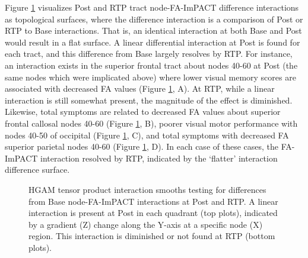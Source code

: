\documentclass[12pt]{article}
\begin{document}
Figure \ref{fig:lgio-intx-cc} visualizes Post and RTP tract node-FA-ImPACT difference interactions as topological surfaces, where the difference interaction is a comparison of Post or RTP to Base interactions. That is, an identical interaction at both Base and Post would result in a flat surface. A linear differential interaction at Post is found for each tract, and this difference from Base largely resolves by RTP. For instance, an interaction exists in the superior frontal tract about nodes 40-60 at Post (the same nodes which were implicated above) where lower visual memory scores are associated with decreased FA values (Figure \ref{fig:lgio-intx-cc}, A). At RTP, while a linear interaction is still somewhat present, the magnitude of the effect is diminished. Likewise, total symptoms are related to decreased FA values about superior frontal callosal nodes 40-60 (Figure \ref{fig:lgio-intx-cc}, B), poorer visual motor performance with nodes 40-50 of occipital (Figure \ref{fig:lgio-intx-cc}, C), and total symptoms with decreased FA superior parietal nodes 40-60 (Figure \ref{fig:lgio-intx-cc}, D). In each case of these cases, the FA-ImPACT interaction resolved by RTP, indicated by the `flatter' interaction difference surface.

\begin{figure}[H]
	\centering
	\caption{HGAM tensor product interaction smooths testing for differences from Base node-FA-ImPACT interactions at Post and RTP. A linear interaction is present at Post in each quadrant (top plots), indicated by a gradient (Z) change along the Y-axis at a specific node (X) region. This interaction is diminished or not found at RTP (bottom plots).}
	\label{fig:lgio-intx-cc}
\end{figure}
\end{document}
